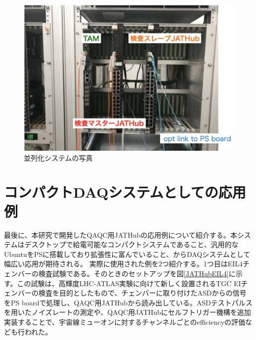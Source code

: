 \begin{figure} 
\centering
\includegraphics[width=16cm]{fig/QAQC/QAQCpararellpicture.png}
\caption[並列化システムの写真]{並列化システムの写真}
\label{QAQCpararellpicture}
\end{figure}

\section{コンパクトDAQシステムとしての応用例}
\label{sec_compactdaq}
最後に、本研究で開発したQAQC用JATHubの応用例について紹介する。本システムはデスクトップで給電可能なコンパクトシステムであること、汎用的なUbuntuをPSに搭載しており拡張性に富んでいること、からDAQシステムとして幅広い応用が期待される。
実際に使用された例を2つ紹介する。1つ目はEIL4チェンバーの検査試験である。そのときのセットアップを図\ref{JATHubEIL4}に示す。この試験は、高輝度LHC-ATLAS実験に向けて新しく設置されるTGC EIチェンバーの検査を目的としたもので、チェンバーに取り付けたASDからの信号をPS boardで処理し、QAQC用JATHubから読み出している。ASDテストパルスを用いたノイズレートの測定や、QAQC用JATHubにセルフトリガー機構を追加実装することで、宇宙線ミューオンに対するチャンネルごとのefficiencyの評価なども行われた。
\baselineskip

